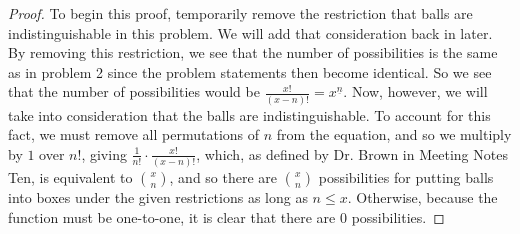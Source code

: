\documentclass[12pt]{article}
\newcommand{\fallfac}[2]{{#1}^{\underline{#2}}}
\newenvironment{problem}[2][Problem]{\begin{trivlist}
\item[\hskip \labelsep {\bfseries #1}\hskip \labelsep {\bfseries #2.}]}{\end{trivlist}}
\begin{document}
\begin{problem}{5}
\end{problem}
\begin{proof}
To begin this proof, temporarily remove the restriction that balls are indistinguishable in this problem. We will add that consideration back in later. By removing this restriction, we see that the number of possibilities is the same as in problem 2 since the problem statements then become identical. So we see that the number of possibilities would be $\frac{x!}{(x-n)!} = \fallfac{x}{n}$. Now, however, we will take into consideration that the balls are indistinguishable. To account for this fact, we must remove all permutations of $n$ from the equation, and so we multiply by $1$ over $n!$, giving $\frac{1}{n!} \cdot \frac{x!}{(x-n)!}$, which, as defined by Dr. Brown in Meeting Notes Ten, is equivalent to $x \choose{n}$, and so there are $x \choose{n}$ possibilities for putting balls into boxes under the given restrictions as long as $n \leq x$. Otherwise, because the function must be one-to-one, it is clear that there are $0$ possibilities.
\end{proof}
\end{document}
